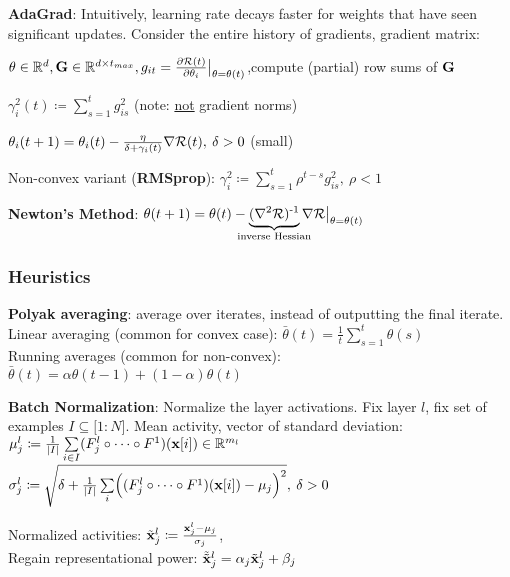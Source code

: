         \textbf{AdaGrad}: Intuitively, learning rate decays faster for weights that have seen significant updates. Consider the entire history of gradients, gradient matrix:
        
        $\theta\in\mathbb R^d,\mathbf G\in\mathbb R^{d\times t_{max}}, g_{it}=\frac{\partial\mathcal{R}(t)}{\partial\theta_i}\bigr|_{\theta=\theta(t)}$,compute (partial) row sums of $\mathbf G$
        
        \tab$\gamma^2_i(t)\coloneqq\sum\limits^t_{s=1}g^2_{is}$ (note: \underline{not} gradient norms)
        
        \tab$\theta_i(t+1)=\theta_i(t)-\frac{\eta}{\delta+\gamma_i(t)}\nabla\mathcal{R}(t),\> \delta>0$ (small)
        
        Non-convex variant (\textbf{RMSprop}): $\gamma_i^2\coloneqq\sum\limits_{s=1}^t\rho^{t-s}g^2_{is},\>\rho<1$
        
        \textbf{Newton's Method}: $\theta(t+1)=\theta(t)-\!\!\!\!\!\underbrace{(\nabla^2\cR)\inv}_\text{inverse Hessian}\!\!\!\!\!\nabla\cR\bigr|_{\theta=\theta(t)}$
        
    
    \subsubsection{Heuristics}
    \label{ssub:heuristics}
        \textbf{Polyak averaging}: average over iterates, instead of outputting the final iterate.\\
        Linear averaging (common for convex case): $\bar{\theta}(t)=\frac{1}{t}\sum\limits_{s=1}^t\theta(s)$\\
        Running averages (common for non-convex): $\bar{\theta}(t)=\alpha\theta(t-1)+(1-\alpha)\theta(t)$
        
        \textbf{Batch Normalization}: Normalize the layer activations. Fix layer $l$, fix set of examples $I\subseteq\lbrack1:N\rbrack$. Mean activity, vector of standard deviation:\\
        
        \tab$\mu_j^l\coloneqq\frac{1}{\lvert I\rvert}\sum\limits_{i\in I}(F^l_j\circ\cdots\circ F^1)(\mathbf x\lbrack i\rbrack)\in\mathbb R^{m_l}$\\
        \tab$\sigma^l_j\coloneqq\sqrt{\delta+\frac{1}{\lvert I\rvert}\sum\limits_i\Bigr((F^l_j\circ\cdots\circ F^1)(\mathbf x\lbrack i\rbrack)-\mu_j\Bigr)^2},\>\delta>0$
        
        Normalized activities: $\Tilde{\mathbf x}^l_j\coloneqq\frac{\mathbf x^l_j-\mu_j}{\sigma_j}$,\\
        Regain representational power: $\Tilde{\Tilde{\mathbf x}}^l_j=\alpha_j\Tilde{\mathbf x}^l_j+\beta_j$
        
